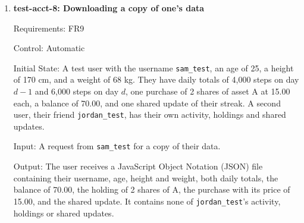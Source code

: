 \documentclass[12pt, titlepage]{article}
\begin{document}
\begin{enumerate}
Control: Automatic

Initial State: A test user with no height or weight in their profile, a
balance of 0, the health notice and simulated market notice acknowledged, and
one accepted friend. Test asset A is priced at 20.00, its market is open, and
its price is within \texttt{QUOTE\_STALENESS\_LIMIT} (15 minutes).

Input: A daily total of 5,000 steps for day $d$. The user then buys 1 share of
A, opens the concept explanation of \textit{Stock}, completes the knowledge
check on \textit{Stock} with every answer correct, and shares their streak
with their friend.

Output: The balance increases by 50, then decreases by 20.00 to 30.00 when the
share is bought. The explanation opens, the knowledge check returns a result,
and the shared streak appears in the friend's social feed. No request is
refused for missing height or weight.

Test Case Derivation: The fit criterion of FR8 names four features, earning,
trading, learning and sharing, and the test uses each one with both values
empty. 5,000 steps earn $\lfloor 5000 / 100 \rfloor = 50$ (SRS Section 6.7),
and one share at 20.00 costs 20.00. A feature that wrongly required height or
weight would refuse its request or fail to calculate a result.

How test will be performed: A pytest test sends each request through the API
and checks each response, the balance, and the friend's feed.

\item{\textbf{test-acct-8: Downloading a copy of one's data}\\}

Requirements: FR9

Control: Automatic

Initial State: A test user with the username \texttt{sam\_test}, an age of
25, a height of 170 cm, and a weight of 68 kg. They have daily totals of 4,000
steps on day $d-1$ and 6,000 steps on day $d$, one purchase of 2 shares of
asset A at 15.00 each, a balance of 70.00, and one shared update of their
streak. A second user, their friend \texttt{jordan\_test}, has their own
activity, holdings and shared updates.

Input: A request from \texttt{sam\_test} for a copy of their data.

Output: The user receives a JavaScript Object Notation (JSON) file containing
their username, age, height and weight, both daily totals, the balance of
70.00, the holding of 2 shares of A, the purchase with its price of 15.00, and
the shared update. It contains none of \texttt{jordan\_test}'s activity,
holdings or shared updates.


\end{enumerate}
\end{document}
